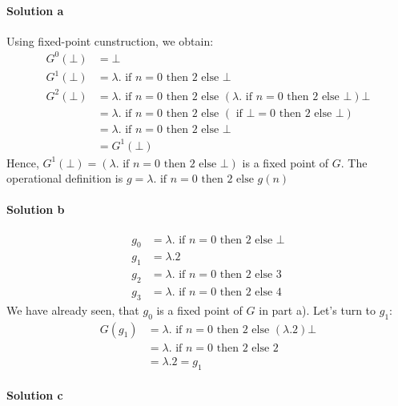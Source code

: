\documentclass{article}[12pt]
\newcommand{\myif}{\ensuremath{\text{ if }}}
\newcommand{\then}{\ensuremath{\text{ then }}}
\newcommand{\myelse}{\ensuremath{\text{ else }}}
\begin{document}
\paragraph{Solution a}
Using fixed-point cunstruction, we obtain:
\begin{align*}
    G^0(\bot) &= \bot\\
    G^1(\bot) &= \lambda.\myif n = 0 \then 2 \myelse \bot\\
    G^2(\bot) &= \lambda.\myif n = 0 \then 2 \myelse (\lambda.\myif n = 0 \then 2 \myelse \bot) \bot\\
              &= \lambda.\myif n = 0 \then 2 \myelse (\myif \bot = 0 \then 2 \myelse \bot)\\
              &= \lambda.\myif n = 0 \then 2 \myelse \bot\\
              &= G^1(\bot)
\end{align*}
Hence, $G^1(\bot) = (\lambda.\myif n = 0 \then 2 \myelse \bot)$ is a fixed point of $G$.
The operational definition is $g = \lambda.\myif n = 0 \then 2 \myelse g(n)$
\paragraph{Solution b}
\begin{align*}
g_0 &= \lambda.\myif n = 0 \then 2 \myelse \bot\\
g_1 &= \lambda. 2\\ 
g_2 &= \lambda.\myif n = 0 \then 2 \myelse 3\\
g_3 &= \lambda.\myif n = 0 \then 2 \myelse 4
\end{align*}
We have already seen, that $g_0$ is a fixed point of $G$ in part a).
Let's turn to $g_1$:
\begin{align*}
    G(g_1) &= \lambda.\myif n = 0 \then 2 \myelse (\lambda. 2) \bot\\
           &= \lambda.\myif n = 0 \then 2 \myelse 2\\
           &= \lambda.2 = g_1
\end{align*}

\paragraph{Solution c}
\paragraph{} %
\begin{figure}[H]
\end{figure}
\end{document}
